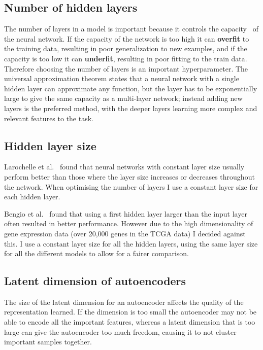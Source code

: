 \subsection{Number of hidden layers}
The number of layers in a model is important because it controls the capacity~\cite{Goodfellow-et-al-2016} of the neural network. If the 
capacity of the network is too high it can \textbf{overfit} to the training data, resulting in poor generalization to new examples, and if the capacity is 
too low it can \textbf{underfit}, resulting in poor fitting to the train data. Therefore choosing the number of layers is an important hyperparameter.
The universal approximation theorem states that a neural network with a single hidden layer can approximate any function, but the layer 
has to be exponentially large to give the same capacity as a multi-layer network; instead adding new layers is the preferred method, 
with the deeper layers learning more complex and relevant features to the task.

\subsection{Hidden layer size}
Larochelle et al.~\cite{DBLP:journals/jmlr/LarochelleBLL09} found that neural networks with constant layer size usually perform better than
those where the layer size increases or decreases throughout the network. When optimising the number of layers I use a constant layer size
for each hidden layer.

Bengio et al.~\cite{DBLP:series/lncs/Bengio12} found that using a first hidden layer larger than the input layer often resulted in 
better performance. However due to the high dimensionality of gene expression data (over 20,000 genes in the TCGA data) I decided against 
this. I use a constant layer size for all the hidden layers, using the same layer size for all the different models to allow for a fairer
comparison.

\subsection{Latent dimension of autoencoders}
The size of the latent dimension for an autoencoder affects the quality of the representation learned. If the dimension is too small the 
autoencoder may not be able to encode all the important features, whereas a latent dimension that is too large can give the autoencoder 
too much freedom, causing it to not cluster important samples together.

